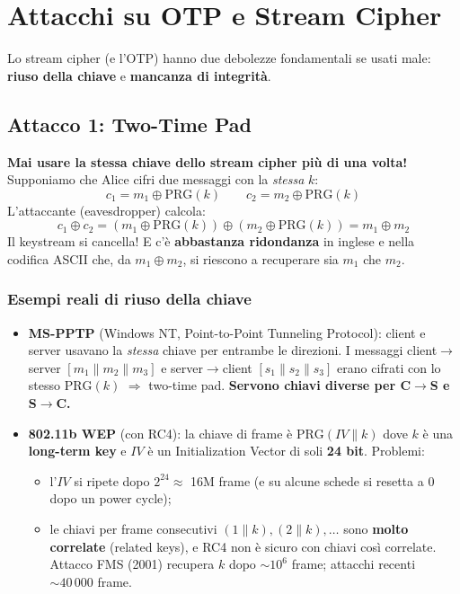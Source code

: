\section{Attacchi su OTP e Stream Cipher}
Lo stream cipher (e l'OTP) hanno due debolezze fondamentali se usati male: \textbf{riuso della chiave} e \textbf{mancanza di integrità}.

\subsection{Attacco 1: Two-Time Pad}
\textbf{Mai usare la stessa chiave dello stream cipher più di una volta!} Supponiamo che Alice cifri due messaggi con la \emph{stessa} $k$:
\[
  c_1 = m_1 \oplus \mathrm{PRG}(k) \qquad c_2 = m_2 \oplus \mathrm{PRG}(k)
\]
L'attaccante (eavesdropper) calcola:
\[
  c_1 \oplus c_2 = (m_1 \oplus \mathrm{PRG}(k)) \oplus (m_2 \oplus \mathrm{PRG}(k)) = m_1 \oplus m_2
\]
Il keystream si cancella! E c'è \textbf{abbastanza ridondanza} in inglese e nella codifica ASCII che, da $m_1 \oplus m_2$, si riescono a recuperare sia $m_1$ che $m_2$.

\subsubsection{Esempi reali di riuso della chiave}
\begin{itemize}
  \item \textbf{MS-PPTP} (Windows NT, Point-to-Point Tunneling Protocol): client e server usavano la \emph{stessa} chiave per entrambe le direzioni. I messaggi client$\to$server $[m_1\|m_2\|m_3]$ e server$\to$client $[s_1\|s_2\|s_3]$ erano cifrati con lo stesso $\mathrm{PRG}(k)$ $\Rightarrow$ two-time pad. \textbf{Servono chiavi diverse per C$\to$S e S$\to$C.}
  \item \textbf{802.11b WEP} (con RC4): la chiave di frame è $\mathrm{PRG}(IV \| k)$ dove $k$ è una \textbf{long-term key} e $IV$ è un Initialization Vector di soli \textbf{24 bit}. Problemi:
  \begin{itemize}
    \item l'$IV$ si ripete dopo $2^{24} \approx$ 16M frame (e su alcune schede si resetta a 0 dopo un power cycle);
    \item le chiavi per frame consecutivi $(1\|k), (2\|k), \dots$ sono \textbf{molto correlate} (related keys), e RC4 non è sicuro con chiavi così correlate. Attacco FMS (2001) recupera $k$ dopo $\sim 10^6$ frame; attacchi recenti $\sim 40\,000$ frame.
  \end{itemize}
\end{itemize}

